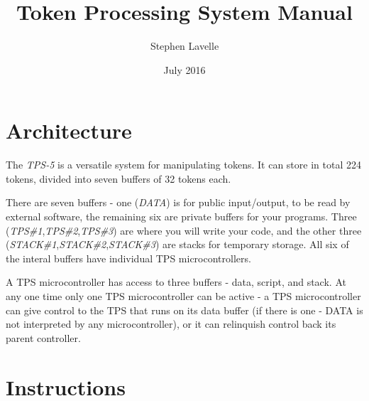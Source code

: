 \documentclass{article}
\title{Token Processing System Manual}
\author{Stephen Lavelle}
\date{July 2016}
\begin{document}
   \maketitle

\section{Architecture}

The \emph{TPS-5} is a versatile system for manipulating tokens.   It can store in total 224 tokens, divided into seven buffers of 32 tokens each.  

There are seven buffers - one (\emph{DATA}) is for public input/output, to be read by external software, the remaining six are private buffers for your programs.  Three (\emph{TPS\#1},\emph{TPS\#2},\emph{TPS\#3}) are where you will write your code, and the other three (\emph{STACK\#1},\emph{STACK\#2},\emph{STACK\#3}) are stacks for temporary storage.  All six of the interal buffers have individual TPS microcontrollers.

A TPS microcontroller has access to three buffers - data, script, and stack.  At any one time only one TPS microcontroller can be active - a TPS microcontroller can give control to the TPS that runs on its data buffer (if there is one - DATA is not interpreted by any microcontroller), or it can relinquish control back its parent controller.


\section{Instructions}
\end{document}
